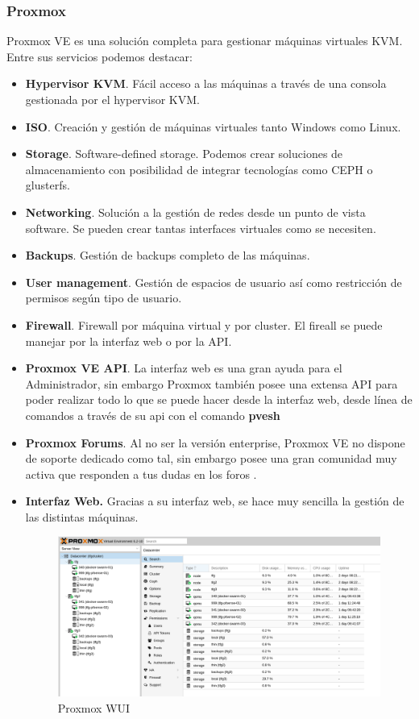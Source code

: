 		\subsubsection{Proxmox}
		\begin{paragraph}
			Proxmox VE es una solución completa para gestionar máquinas virtuales KVM. Entre sus servicios podemos destacar:
			\begin{itemize}
				\item \textbf{Hypervisor KVM}. Fácil acceso a las máquinas a través de una consola gestionada por el hypervisor KVM.
				\item \textbf{ISO}. Creación y gestión de máquinas virtuales tanto Windows como Linux.
				\item \textbf{Storage}. Software-defined storage. Podemos crear soluciones de almacenamiento con posibilidad de integrar tecnologías como CEPH o glusterfs.
				\item \textbf{Networking}. Solución a la gestión de redes desde un punto de vista software. Se pueden crear tantas interfaces virtuales como se necesiten.
				\item \textbf{Backups}. Gestión de backups completo de las máquinas.
				\item \textbf{User management}. Gestión de espacios de usuario así como restricción de permisos según tipo de usuario.
				\item \textbf{Firewall}. Firewall por máquina virtual y por cluster. El fireall se puede manejar por la interfaz web o por la API.
				\item \textbf{Proxmox VE API}. La interfaz web es una gran ayuda para el Administrador, sin embargo Proxmox también posee una extensa API \cite{ProxmoxAPI:online} para poder realizar todo lo que se puede hacer desde la interfaz web, desde línea de comandos a través de su api con el comando \textbf{pvesh}
				\item \textbf{Proxmox Forums}. Al no ser la versión enterprise, Proxmox VE no dispone de soporte dedicado como tal, sin embargo posee una gran comunidad muy activa que responden a tus dudas en los foros \cite{ProxmoxForum:online}.
				\item \textbf{Interfaz Web.} Gracias a su interfaz web, se hace muy sencilla la gestión de las distintas máquinas.
				\begin{figure}[!hbt]
					\centering
					\includegraphics[scale=0.355]{imagenes/Diseno/proxmox_wui.png}
					\caption[Proxmox WUI]{Proxmox WUI} 
					\label{Proxmox WUI}
				\end{figure}
			\end{itemize}
 

\end{paragraph}
